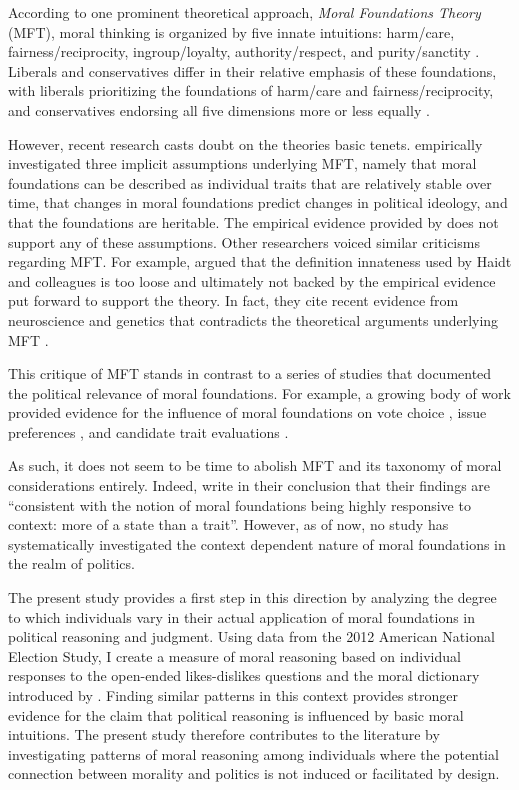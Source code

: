 \documentclass[12pt]{article}
\begin{document}
According to one prominent theoretical approach, \textit{Moral Foundations Theory} (MFT), moral thinking is organized by five innate intuitions: harm/care, fairness/reciprocity, ingroup/loyalty, authority/respect, and purity/sanctity \citep{haidt2008moral}. Liberals and conservatives differ in their relative emphasis of these foundations, with liberals prioritizing the foundations of harm/care and fairness/reciprocity, and conservatives endorsing all five dimensions more or less equally \citep{graham2009liberals}.

However, recent research casts doubt on the theories basic tenets. \citet{smith2016intuitive} empirically investigated three implicit assumptions underlying MFT, namely that moral foundations can be described as individual traits that are relatively stable over time, that changes in moral foundations predict changes in political ideology, and that the foundations are heritable. The empirical evidence provided by \citet{smith2016intuitive} does not support any of these assumptions. Other researchers voiced similar criticisms regarding MFT. For example, \citet{suhler2011can} argued that the definition innateness used by Haidt and colleagues is too loose and ultimately not backed by the empirical evidence put forward to support the theory. In fact, they cite recent evidence from neuroscience and genetics that contradicts the theoretical arguments underlying MFT \citep{suhler2011can}.

This critique of MFT stands in contrast to a series of studies that documented the political relevance of moral foundations. For example, a growing body of work provided evidence for the influence of moral foundations on vote choice \citep{iyer2010beyond, franks2015using}, issue preferences \citep{koleva2012tracing, low2015moral, clifford2015concerns}, and candidate trait evaluations \citep{clifford2014linking}. 

As such, it does not seem to be time to abolish MFT and its taxonomy of moral considerations entirely. Indeed, \citet{smith2016intuitive} write in their conclusion that their findings are ``consistent with the notion of moral foundations being highly responsive to context: more of a state than a trait''. However, as of now, no study has systematically investigated the context dependent nature of moral foundations in the realm of politics.

The present study provides a first step in this direction by analyzing the degree to which individuals vary in their actual application of moral foundations in political reasoning and judgment. Using data from the 2012 American National Election Study, I create a measure of moral reasoning based on individual responses to the open-ended likes-dislikes questions and the moral dictionary introduced by \citet{graham2009liberals}. Finding similar patterns in this context provides stronger evidence for the claim that political reasoning is influenced by basic moral intuitions. The present study therefore contributes to the literature by investigating patterns of moral reasoning among individuals where the potential connection between morality and politics is not induced or facilitated by design.
\end{document}
